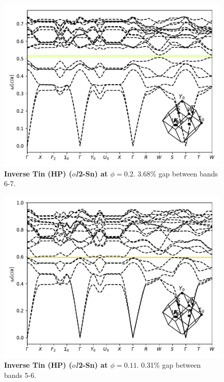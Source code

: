 \documentclass[fleqn,amsmath,amssymb,superscriptaddress, reprint,prl]{revtex4-1}
\begin{document}
\begin{figure}
\includegraphics[width=0.9\linewidth]{workspace/22082630ff52e52b9c7878bd035defaa/images/r=53.pdf}
	\caption{\textbf{Inverse Tin (HP) ($oI$2-Sn) at $\phi=0.2$}. 3.68\% gap between bands 6-7.}
\end{figure}

\begin{figure}
\includegraphics[width=0.9\linewidth]{workspace/22082630ff52e52b9c7878bd035defaa/images/r=56.pdf}
	\caption{\textbf{Inverse Tin (HP) ($oI$2-Sn) at $\phi=0.11$}. 0.31\% gap between bands 5-6.}
\end{figure}
\end{document}
